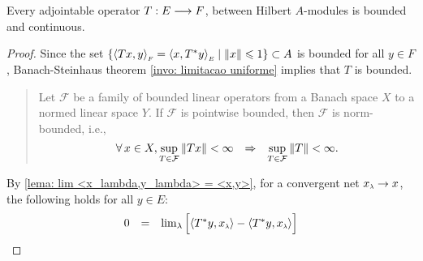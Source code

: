 \begin{proposicao}
    Every adjointable operator $T:E \longrightarrow F$, between Hilbert $A$-modules is bounded and continuous.
    \begin{proof}
        Since the set $\{\sub{\inner{Tx}y}F = \sub{\inner{x}{T^*y}}E \mid \|x\|\leq 1\} \subset A$ is bounded for all $y \in F$, Banach-Steinhaus theorem \ref{invo: limitacao uniforme} implies that $T$ is bounded. 
        \begin{quote}
            \begin{invocacao}
        \label{invo: limitacao uniforme}
        Let $\mathcal{F}$ be a family of bounded linear operators from a Banach space $X$ to a normed linear space $Y$. If $\mathcal{F}$ is pointwise bounded, then $\mathcal{F}$ is norm-bounded, i.e.,
        \[\forall\,x\in X, \displaystyle \sup _{T \in \mathcal{F}}\|T x\|<\infty \hspace{0.25cm} \Rightarrow \hspace{0.25cm} \sup _{T \in \mathcal{F}}\|T\|<\infty.\]
        \end{invocacao}
        \end{quote}
        By \ref{lema: lim <x_lambda,y_lambda> = <x,y>}, for a convergent net $\sub x\lambda \to x$, the following holds for all $y\in E$:
        \begin{equation*}{}
        \begin{array}{rcl}
        0 &=& \lim_\lambda \Big[\inner{T^*y}{\sub x\lambda} - \inner{T^*y}{\sub x\lambda}\Big]\\

\end{array}
\end{equation*}
\end{proof}
\end{proposicao}
